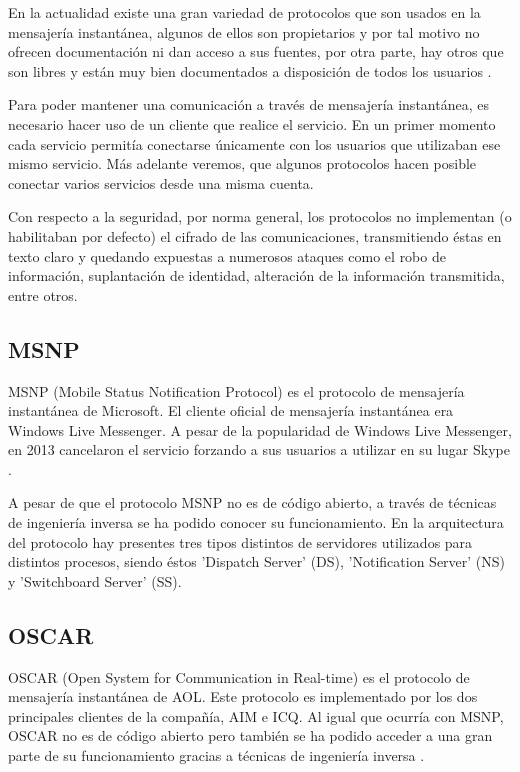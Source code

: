 En la actualidad existe una gran variedad de protocolos que son usados en la mensajería instantánea, algunos de ellos son propietarios y por tal motivo no ofrecen documentación ni dan acceso a sus fuentes, por otra parte, hay otros que son libres y están muy bien documentados a disposición de todos los usuarios \cite{protocoloim2}.

Para poder mantener una comunicación a través de mensajería instantánea, es necesario hacer uso de un cliente que realice el servicio. En un primer momento cada servicio permitía conectarse únicamente con los usuarios que utilizaban ese mismo servicio. Más adelante veremos, que algunos protocolos hacen posible conectar varios servicios desde una misma cuenta.

Con respecto a la seguridad, por norma general, los protocolos no implementan (o habilitaban por defecto) el cifrado de las comunicaciones, transmitiendo éstas en texto claro y quedando expuestas a numerosos ataques como el robo de información, suplantación de identidad, alteración de la información transmitida, entre otros.

\subsection{MSNP}

MSNP (Mobile Status Notification Protocol) es el protocolo de mensajería instantánea de Microsoft. El cliente oficial de mensajería instantánea era Windows Live Messenger. A pesar de la popularidad de Windows Live Messenger, en 2013 cancelaron el servicio forzando a sus usuarios a utilizar en su lugar Skype \cite{protocoloim1}.

A pesar de que el protocolo MSNP no es de código abierto, a través de técnicas de ingeniería inversa se ha podido conocer su funcionamiento. En la arquitectura del protocolo hay presentes tres tipos distintos de servidores utilizados para distintos procesos, siendo éstos 'Dispatch Server' (DS), 'Notification Server' (NS) y 'Switchboard Server' (SS).

\subsection{OSCAR}

OSCAR (Open System for Communication in Real-time) es el protocolo de mensajería instantánea de AOL. Este protocolo es implementado por los dos principales clientes de la compañía, AIM e ICQ. Al igual que ocurría con MSNP, OSCAR no es de código abierto pero también se ha podido acceder a una gran parte de su funcionamiento gracias a técnicas de ingeniería inversa \cite{protocoloim1}.

